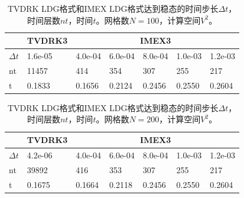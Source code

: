 \begin{table}
	\centering
	\begin{tabularx}{\textwidth}{@{} *7{X} @{}}
		\toprule
		           & \multicolumn{1}{c}{TVDRK3} & \multicolumn{5}{c}{IMEX3}                                         \\
		\cmidrule(lr){2-2} \cmidrule(lr){3-7}
		\midrule
		$\Delta t$ & 1.6e-05                    & 4.0e-04                   & 6.0e-04 & 8.0e-04 & 1.0e-03 & 1.2e-03 \\
		nt         & 11457                      & 414                       & 354     & 307     & 255     & 217     \\
		t          & 0.1833                     & 0.1656                    & 0.2124  & 0.2456  & 0.2550  & 0.2604  \\
		\bottomrule
	\end{tabularx}
	\caption{TVDRK LDG格式和IMEX LDG格式达到稳态的时间步长$\Delta t$，时间层数$nt$，时间$t$。网格数$N=100$，计算空间$V^2$。}
	\label{tab:time:100}
\end{table}
\begin{table}
	\begin{tabularx}{\textwidth}{@{} *7{X} @{}}
		\toprule
		           & \multicolumn{1}{c}{TVDRK3} & \multicolumn{5}{c}{IMEX3}                                         \\
		\cmidrule(lr){2-2} \cmidrule(lr){3-7}
		\midrule
		$\Delta t$ & 4.2e-06                    & 4.0e-04                   & 6.0e-04 & 8.0e-04 & 1.0e-03 & 1.2e-03 \\
		nt         & 39892                      & 416                       & 353     & 307     & 255     & 217     \\
		t          & 0.1675                     & 0.1664                    & 0.2118  & 0.2456  & 0.2550  & 0.2604  \\
		\bottomrule
	\end{tabularx}
	\caption{TVDRK LDG格式和IMEX LDG格式达到稳态的时间步长$\Delta t$，时间层数$nt$，时间$t$。网格数$N=200$，计算空间$V^2$。}
	\label{tab:time:200}
\end{table}

